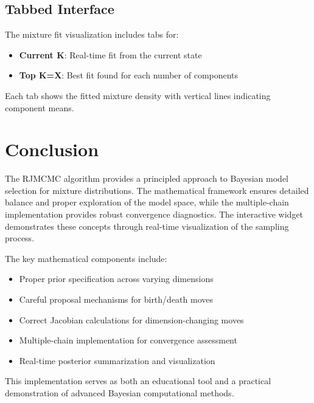 \documentclass[12pt]{article}
\begin{document}
\subsection{Tabbed Interface}

The mixture fit visualization includes tabs for:
\begin{itemize}
\item \textbf{Current K}: Real-time fit from the current state
\item \textbf{Top K=X}: Best fit found for each number of components
\end{itemize}

Each tab shows the fitted mixture density with vertical lines indicating component means.

\section{Conclusion}

The RJMCMC algorithm provides a principled approach to Bayesian model selection for mixture distributions. The mathematical framework ensures detailed balance and proper exploration of the model space, while the multiple-chain implementation provides robust convergence diagnostics. The interactive widget demonstrates these concepts through real-time visualization of the sampling process.

The key mathematical components include:
\begin{itemize}
\item Proper prior specification across varying dimensions
\item Careful proposal mechanisms for birth/death moves
\item Correct Jacobian calculations for dimension-changing moves
\item Multiple-chain implementation for convergence assessment
\item Real-time posterior summarization and visualization
\end{itemize}

This implementation serves as both an educational tool and a practical demonstration of advanced Bayesian computational methods.
\end{document}
